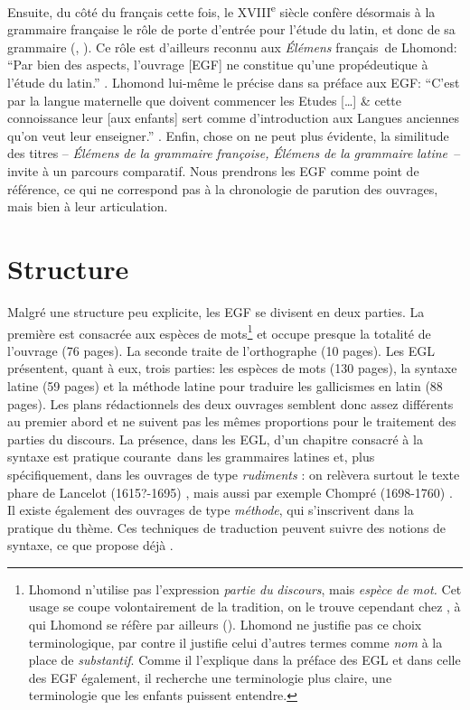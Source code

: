 \documentclass[output=paper]{langsci/langscibook}
\begin{document}
Ensuite, du côté du français cette fois, le XVIII\textsuperscript{e} siècle confère désormais à la grammaire française le rôle de porte d’entrée pour l’étude du latin, et donc de sa grammaire (\citealt{chevalier_histoire_2006}, \citealt{chervel_et_1977}). Ce rôle est d’ailleurs reconnu aux \textit{Élémens} français~de Lhomond: “Par bien des aspects, l’ouvrage [EGF] ne constitue qu’une propédeutique à l’étude du latin.” \citep[165]{colombat_grammaire_1999}. Lhomond lui-même le précise dans sa préface aux EGF: “C’est par la langue maternelle que doivent commencer les Etudes […] \& cette connoissance leur [aux enfants] sert comme d’introduction aux Langues anciennes qu’on veut leur enseigner.” \citep[3]{lhomond_elemens_1790}. Enfin, chose on ne peut plus évidente, la similitude des titres – \textit{Élémens} \textit{de} \textit{la} \textit{grammaire} \textit{françoise,} \textit{Élémens} \textit{de} \textit{la} \textit{grammaire} \textit{latine~}– invite à un parcours comparatif. Nous prendrons les EGF comme point de référence, ce qui ne correspond pas à la chronologie de parution des ouvrages, mais bien à leur articulation.

\section{Structure}

Malgré une structure peu explicite, les EGF se divisent en deux parties. La première est consacrée aux espèces de mots\footnote{\textrm{Lhomond n’utilise pas l’expression} \textrm{\textit{partie} \textit{du} \textit{discours}}\textrm{, mais} \textrm{\textit{espèce} \textit{de} \textit{mot.}} \textrm{Cet usage se coupe volontairement de la tradition, on le trouve cependant chez \citet{olivet_remarques_1767}, à qui Lhomond se réfère par ailleurs (\citeyear[63]{lhomond_elemens_1790}). Lhomond ne justifie pas ce choix terminologique, par contre il justifie celui d’autres termes comme} \textrm{\textit{nom}} \textrm{à la place de} \textrm{\textit{substantif}}\textrm{. Comme il l’explique dans la préface des EGL et dans celle des EGF également, il recherche une terminologie plus claire, une terminologie que les enfants puissent entendre.}} et occupe presque la totalité de l’ouvrage (76 pages). La seconde traite de l’orthographe (10 pages). Les EGL présentent, quant à eux, trois parties: les espèces de mots (130 pages), la syntaxe latine (59 pages) et la méthode latine pour traduire les gallicismes en latin (88 pages). Les plans rédactionnels des deux ouvrages semblent donc assez différents au premier abord et ne suivent pas les mêmes proportions pour le traitement des parties du discours. La présence, dans les EGL, d’un chapitre consacré à la syntaxe est pratique courante~dans les grammaires latines et, plus spécifiquement, dans les ouvrages de type \textit{rudiments} \citep{colombat_grammaire_1999}: on relèvera surtout le texte phare de Lancelot (1615?-1695) \citeyear{lancelot_nouvelle_1644}, mais aussi par exemple Chompré (1698-1760) \citeyear{chompre_introduction_1751}. Il existe également des ouvrages de type \textit{méthode}, qui s’inscrivent dans la pratique du thème. Ces techniques de traduction peuvent suivre des notions de syntaxe, ce que propose déjà \citet{lancelot_nouvelle_1644}.
\end{document}
